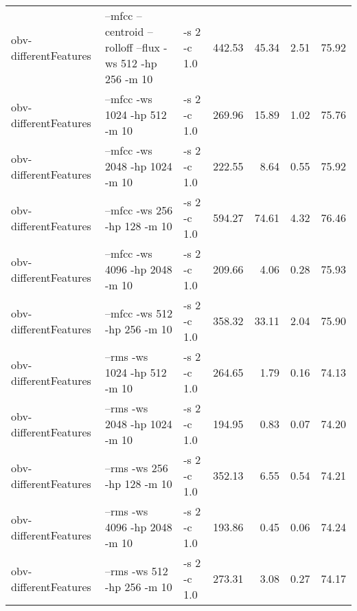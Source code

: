 \documentclass[11pt,a4paper]{article}
\begin{document}
\begin{tabular}{lllrrrr}
 obv-differentFeatures  &  --mfcc --centroid --rolloff --flux -ws 512 -hp 256 -m 10                                                           &  -s 2 -c 1.0  &   442.53  &   45.34  &   2.51  &  75.92  \\
 obv-differentFeatures  &  --mfcc -ws 1024 -hp 512 -m 10                                                                                      &  -s 2 -c 1.0  &   269.96  &   15.89  &   1.02  &  75.76  \\
 obv-differentFeatures  &  --mfcc -ws 2048 -hp 1024 -m 10                                                                                     &  -s 2 -c 1.0  &   222.55  &    8.64  &   0.55  &  75.92  \\
 obv-differentFeatures  &  --mfcc -ws 256 -hp 128 -m 10                                                                                       &  -s 2 -c 1.0  &   594.27  &   74.61  &   4.32  &  76.46  \\
 obv-differentFeatures  &  --mfcc -ws 4096 -hp 2048 -m 10                                                                                     &  -s 2 -c 1.0  &   209.66  &    4.06  &   0.28  &  75.93  \\
 obv-differentFeatures  &  --mfcc -ws 512 -hp 256 -m 10                                                                                       &  -s 2 -c 1.0  &   358.32  &   33.11  &   2.04  &  75.90  \\
 obv-differentFeatures  &  --rms -ws 1024 -hp 512 -m 10                                                                                       &  -s 2 -c 1.0  &   264.65  &    1.79  &   0.16  &  74.13  \\
 obv-differentFeatures  &  --rms -ws 2048 -hp 1024 -m 10                                                                                      &  -s 2 -c 1.0  &   194.95  &    0.83  &   0.07  &  74.20  \\
 obv-differentFeatures  &  --rms -ws 256 -hp 128 -m 10                                                                                        &  -s 2 -c 1.0  &   352.13  &    6.55  &   0.54  &  74.21  \\
 obv-differentFeatures  &  --rms -ws 4096 -hp 2048 -m 10                                                                                      &  -s 2 -c 1.0  &   193.86  &    0.45  &   0.06  &  74.24  \\
 obv-differentFeatures  &  --rms -ws 512 -hp 256 -m 10                                                                                        &  -s 2 -c 1.0  &   273.31  &    3.08  &   0.27  &  74.17  \\

\end{tabular}
\end{document}

